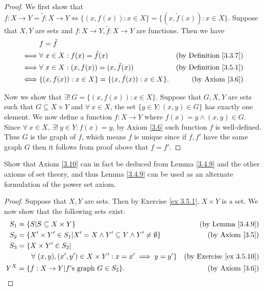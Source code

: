 \begin{proof}
We first show that \(f : X \to Y = \tilde{f} : X \to Y \iff \{(x, f(x)) : x \in X\} = \{(x, \tilde{f}(x)) : x \in X\}\).
Suppose that \(X, Y\) are sets and \(f : X \to Y, \tilde{f} : X \to Y\) are functions.
Then we have
\begin{align*}
& f = \tilde{f} \\
\iff & \forall\ x \in X : f(x) = \tilde{f}(x) & \text{(by Definition \ref{3.3.7})} \\
\iff & \forall\ x \in X : (x, f(x)) = (x, \tilde{f}(x)) & \text{(by Definition \ref{3.5.1})} \\
\iff & \{(x, f(x)) : x \in X\} = \{(x, \tilde{f}(x)) : x \in X\}. & \text{(by Axiom \ref{3.6})}
\end{align*}

Now we show that \(\exists!\ G = \{(x, f(x)) : x \in X\}\).
Suppose that \(G, X, Y\) are sets such that \(G \subseteq X \times Y\) and \(\forall\ x \in X\), the set \(\{y \in Y : (x, y) \in G\}\) has exactly one element.
We now define a function \(f : X \to Y\) where \(f(x) = y \land (x, y) \in G\).
Since \(\forall\ x \in X\), \(\exists!\ y \in Y : f(x) = y\), by Axiom \ref{3.6} such function \(f\) is well-defined.
Thus \(G\) is the graph of \(f\), which means \(f\) is unique since if \(f, f'\) have the same graph \(G\) then it follows from proof above that \(f = f'\).
\end{proof}

\begin{exercise}\label{ex 3.5.11}
Show that Axiom \ref{3.10} can in fact be deduced from Lemma \ref{3.4.9} and the other axioms of set theory, and thus Lemma \ref{3.4.9} can be used as an alternate formulation of the power set axiom.
\end{exercise}

\begin{proof}
Suppose that \(X, Y\) are sets.
Then by Exercise \ref{ex 3.5.1}, \(X \times Y\) is a set.
We now show that the following sets exist:
\begin{align*}
S_1 &= \{S | S \subseteq X \times Y\} & \text{(by Lemma \ref{3.4.9})} \\
S_2 &= \{X' \times Y' \in S_1 | X' = X \land Y' \subseteq Y \land Y' \neq \emptyset\} & \text{(by Axiom \ref{3.5})} \\
S_3 &= \{X \times Y' \in S_2 | \\
& \quad\quad \forall\ (x, y), (x', y') \in X \times Y' : x = x' \implies y = y'\} & \text{(by Exercise \ref{ex 3.5.10})} \\
Y^X &= \{f : X \to Y | f \text{'s graph } G \in S_3\}. & \text{(by Axiom \ref{3.6})}
\end{align*}
\end{proof}

